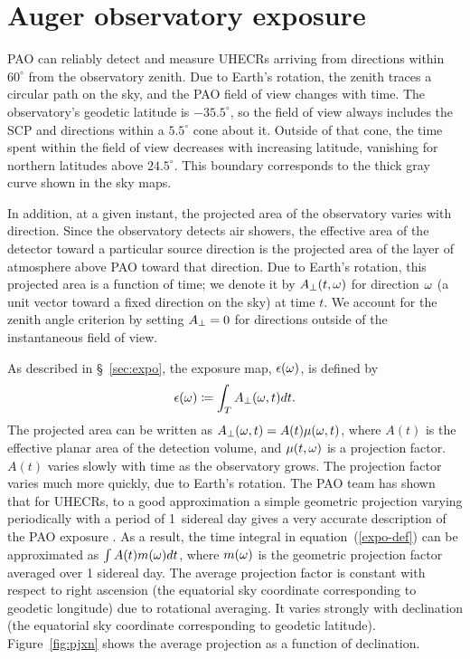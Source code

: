 \section{Auger observatory exposure}
\label{app:expo}

PAO can reliably detect and measure UHECRs arriving from directions within
$60^\circ$ from the observatory zenith.  Due to Earth's rotation, the zenith
traces a circular path on the sky, and the PAO field of view changes with time.
The observatory's geodetic latitude is $-35.5^\circ$, so the field of view
always includes the SCP and directions within a $5.5^\circ$ cone about it.
Outside of that cone, the time spent within the field of view decreases with
increasing latitude, vanishing for northern latitudes above $24.5^\circ$.  This
boundary corresponds to the thick gray curve shown in the sky maps.

In addition, at a given instant, the projected area of the observatory varies
with direction.  Since the observatory detects air showers, the effective area
of the detector toward a particular source direction is the projected area of
the layer of atmosphere above PAO toward that direction.  Due to Earth's
rotation, this projected area is a function of time; we denote it by
$A_\perp(t,\omega)$ for direction $\omega$ (a unit vector toward a fixed direction
on the sky) at time $t$.  We account for the zenith angle criterion by
setting $A_\perp=0$ for directions outside of the instantaneous field of view.

As described in \S~\ref{sec:expo}, the exposure map, $\epsilon(\omega)$,
is defined by
\begin{equation}
\expo(\tdrxn) \coloneqq \int_T  \Aperp(\tdrxn,t) dt.
\label{expo-def}
\end{equation}
The projected area can be written as $A_\perp(\omega,t) = A(t) \mu(\omega,t)$,
where $A(t)$ is the effective planar area of the detection volume, and
$\mu(t,\omega)$ is a projection factor.  $A(t)$ varies slowly with time as
the observatory grows.  The projection factor varies much more quickly, due
to Earth's rotation. The PAO team has shown that for UHECRs, to a good
approximation a simple geometric projection varying periodically with a
period of 1~sidereal day gives a very accurate description of the PAO
exposure \cite{2001APh....14..271S}. As a result, the time integral in
equation~(\ref{expo-def}) can be approximated as $\int A(t) m(\omega) dt$,
where $m(\omega)$ is the geometric projection factor averaged over 1
sidereal day. The average projection factor is constant with respect to
right ascension (the equatorial sky coordinate corresponding to geodetic
longitude) due to rotational averaging.  It varies strongly with declination
(the equatorial sky coordinate corresponding to geodetic latitude).
Figure~\ref{fig:pjxn} shows the average projection as a function of
declination.

